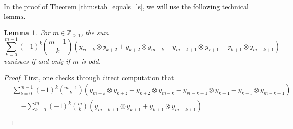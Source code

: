 \documentclass[11pt, a4paper]{amsart}
\newtheorem{lemma}[theorem]{Lemma}
\numberwithin{equation}{section}
\theoremstyle{definition}
\begin{document}
In the proof of Theorem \ref{thm:stab_equals_ls}, we will use the following technical lemma.
\begin{lemma} \label{lem:nonvanishing_sum}
    For $m \in \mathbb{Z}_{\geq 1}$, the sum
    \[
        \sum_{k=0}^{m-1} (-1)^{k} \binom{m-1}{k} \left(y_{m-k} \otimes y_{k+2} + y_{k+2} \otimes y_{m-k} - y_{m-k+1} \otimes y_{k+1} - y_{k+1} \otimes y_{m-k+1} \right)
    \]
    vanishes if and only if $m$ is odd.
\end{lemma}
\begin{proof}
    First, one checks through direct computation that
    \begin{align*}
        & \sum_{k=0}^{m-1} (-1)^{k} \binom{m-1}{k} \left(y_{m-k} \otimes y_{k+2} + y_{k+2} \otimes y_{m-k} - y_{m-k+1} \otimes y_{k+1} - y_{k+1} \otimes y_{m-k+1} \right) \\
        & = - \sum_{k=0}^{m} (-1)^{k} \binom{m}{k} (y_{m-k+1} \otimes y_{k+1} + y_{k+1} \otimes y_{m-k+1}) \\

\end{align*}
\end{proof}
\end{document}
